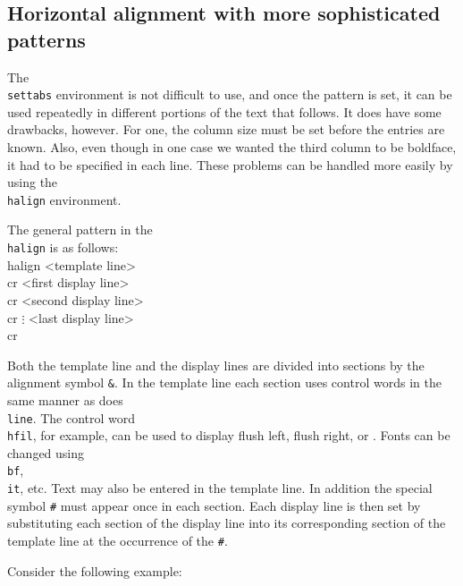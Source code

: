 \subsection{Horizontal alignment with more sophisticated patterns} 
 
The {\tt \\settabs} environment is not difficult to use, and once 
the pattern is set, it can be used repeatedly in different 
portions of the text that follows.  It does have some drawbacks, 
however. For one, the column size must be set before the entries 
are known. Also, even though in one case we wanted the third 
column to be boldface, it had to be specified in each line. 
These problems can be handled more easily by using the {\tt 
\\halign} environment. 
 
 
The general pattern in the {\tt \\halign} is as follows: 
\beginuser 
\\halign\lb{} <template line> \\cr 
<first display line> \\cr 
<second display line> \\cr 
$\vdots$ 
<last display line> \\cr 
\rb 
\enduser 
 
Both the template line and the display lines are divided into 
sections by the alignment symbol {\tt \&}\null. In the template 
line each section uses control words in the same manner as does 
{\tt \\line\lb\rb}\null.  The control word {\tt \\hfil}, for 
example, can be used to display flush left, flush right, or \centred. 
Fonts can be changed using {\tt \\bf}, {\tt \\it}, etc. 
Text may also be entered in the template line.  In addition the 
special symbol {\tt \#} must appear once in each section.  Each 
display line is then set by substituting each section of the 
display line into its corresponding section of the template line 
at the occurrence of the {\tt \#}\null. 
 
Consider the following example: 
 
